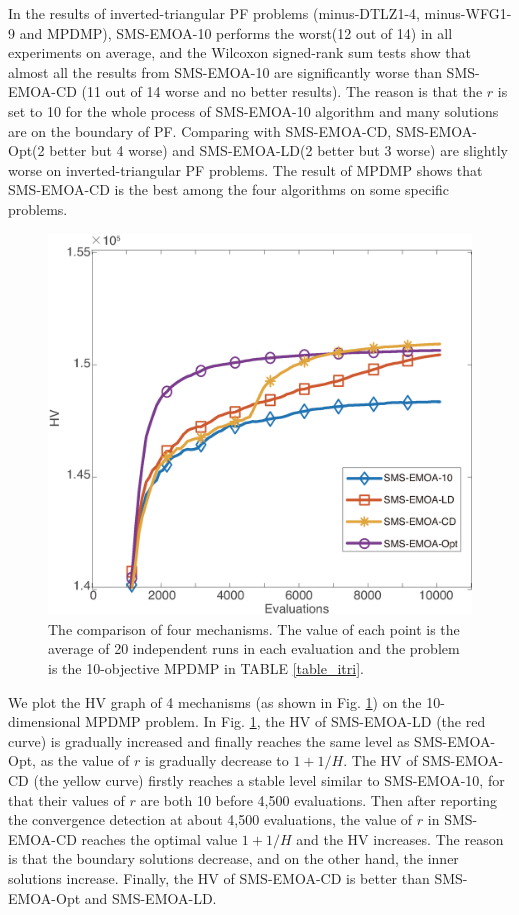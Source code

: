 \documentclass[conference]{IEEEtran}
\begin{document}
In the results of inverted-triangular PF problems (minus-DTLZ1-4, minus-WFG1-9 and MPDMP), 
SMS-EMOA-10 performs the worst(12 out of 14) in all experiments on average, 
and the Wilcoxon signed-rank sum tests show that almost all the results from SMS-EMOA-10 are significantly worse than SMS-EMOA-CD
(11 out of 14 worse and no better results). 
The reason is that the $r$ is set to 10 for the whole process of SMS-EMOA-10 algorithm and many solutions are on the boundary of PF.
Comparing with SMS-EMOA-CD, SMS-EMOA-Opt(2 better but 4 worse) and SMS-EMOA-LD(2 better but 3 worse) are slightly worse 
on inverted-triangular PF problems. 
The result of MPDMP shows that SMS-EMOA-CD is the best among the four algorithms on some specific problems. 

\begin{figure}[!t]
  \centering
    \includegraphics[width=\columnwidth]{SMSEMOA_MPDMP_hv_2}
  \caption{The comparison of four mechanisms. %
  The value of each point is the average of 20 independent runs in each evaluation
  and the problem is the 10-objective MPDMP in TABLE \ref{table_itri}. 
  }
  \label{crdmp}
\end{figure}
We plot the HV graph of 4 mechanisms (as shown in Fig. \ref{crdmp}) on the 10-dimensional MPDMP problem. 
In Fig. \ref{crdmp}, the HV of SMS-EMOA-LD (the red curve) is gradually increased 
and finally reaches the same level as SMS-EMOA-Opt, as the value of $r$ is gradually decrease to $1+1/H$.
The HV of SMS-EMOA-CD (the yellow curve) firstly reaches a stable level similar to SMS-EMOA-10, 
for that their values of $r$ are both 10 before 4,500 evaluations. %
Then after reporting the convergence detection at about 4,500 evaluations, 
the value of $r$ in SMS-EMOA-CD reaches the optimal value $1+1/H$ 
and the HV increases. 
The reason is that the boundary solutions decrease, and on the other hand, the inner solutions increase. 
Finally, the HV of SMS-EMOA-CD is better than SMS-EMOA-Opt and SMS-EMOA-LD. 
\end{document}
